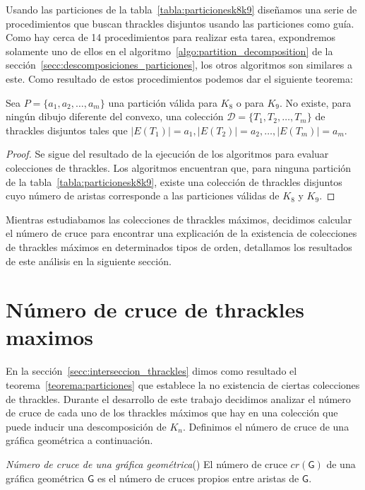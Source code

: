     Usando las particiones de la tabla~\ref{tabla:particionesk8k9} diseñamos
    una serie de procedimientos que buscan thrackles disjuntos usando las particiones como guía.
    Como hay cerca de 14 procedimientos para realizar esta tarea, expondremos solamente
    uno de ellos en el algoritmo~\ref{algo:partition_decomposition} de la sección~\ref{secc:descomposiciones_particiones}, los
    otros algoritmos son similares a este. Como resultado de estos procedimientos podemos dar el
    siguiente teorema:
    \begin{theorem}\label{teorema:particiones}
      Sea $P=\{a_1,a_2,\dots,a_m\}$ una partición válida para $K_8$ o para $K_9$. No existe, para
      ningún dibujo diferente del convexo, una colección $\mathcal{D}=\{T_1,T_2,\dots,T_m\}$ de
      thrackles disjuntos tales que $|E(T_1)|=a_1,|E(T_2)|=a_2,\dots,|E(T_m)|=a_m$.
    \end{theorem}
    \begin{proof}
      Se sigue del resultado de la ejecución de los algoritmos para evaluar colecciones de
      thrackles. Los algoritmos encuentran que, para ninguna partición de la
      tabla~\ref{tabla:particionesk8k9}, existe una colección de thrackles disjuntos cuyo número de
      aristas corresponde a las particiones válidas de $K_8$ y $K_9$.
    \end{proof}

Mientras estudiabamos las colecciones de thrackles máximos, decidimos calcular el número
de cruce para encontrar una explicación de la existencia de colecciones de thrackles
máximos en determinados tipos de orden, detallamos los resultados de este análisis en la
siguiente sección.
\section{Número de cruce de thrackles maximos }\label{secc:cnthracklemax}

En la sección~\ref{secc:interseccion_thrackles} dimos como resultado el
teorema~\ref{teorema:particiones} que establece la no existencia de ciertas colecciones
de thrackles. Durante el desarrollo de este trabajo decidimos analizar el número de cruce
de cada uno de los thrackles máximos que hay en una colección que puede inducir una
descomposición de $K_n$. Definimos el número de cruce de una gráfica geométrica a continuación.

\begin{definition}{\emph{Número de cruce de una gráfica geométrica}(\cite{Schaefer2018})}
  El número de cruce $cr(\mathsf{G})$ de una gráfica geométrica $\mathsf{G}$
  es el número de cruces propios entre aristas de $\mathsf{G}$.
\end{definition}

